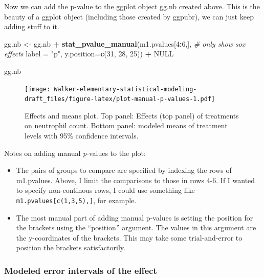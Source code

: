 \documentclass[]{book}
\newenvironment{Shaded}{\begin{snugshade}}{\end{snugshade}}
\newcommand{\CommentTok}[1]{\textcolor[rgb]{0.56,0.35,0.01}{\textit{#1}}}
\newcommand{\DataTypeTok}[1]{\textcolor[rgb]{0.13,0.29,0.53}{#1}}
\newcommand{\DecValTok}[1]{\textcolor[rgb]{0.00,0.00,0.81}{#1}}
\newcommand{\KeywordTok}[1]{\textcolor[rgb]{0.13,0.29,0.53}{\textbf{#1}}}
\newcommand{\NormalTok}[1]{#1}
\newcommand{\OperatorTok}[1]{\textcolor[rgb]{0.81,0.36,0.00}{\textbf{#1}}}
\newcommand{\OtherTok}[1]{\textcolor[rgb]{0.56,0.35,0.01}{#1}}
\newcommand{\StringTok}[1]{\textcolor[rgb]{0.31,0.60,0.02}{#1}}
\providecommand{\tightlist}{%
  \setlength{\itemsep}{0pt}\setlength{\parskip}{0pt}}
\begin{document}
Now we can add the p-value to the ggplot object gg.nb created above. This is the beauty of a ggplot object (including those created by ggpubr), we can just keep adding stuff to it.

\begin{Shaded}
\begin{Highlighting}[]
\NormalTok{gg.nb <-}\StringTok{ }\NormalTok{gg.nb }\OperatorTok{+}
\StringTok{    }\KeywordTok{stat_pvalue_manual}\NormalTok{(m1.pvalues[}\DecValTok{4}\OperatorTok{:}\DecValTok{6}\NormalTok{,], }\CommentTok{# only show sox effects}
                           \DataTypeTok{label =} \StringTok{"p"}\NormalTok{, }
                           \DataTypeTok{y.position=}\KeywordTok{c}\NormalTok{(}\DecValTok{31}\NormalTok{, }\DecValTok{28}\NormalTok{, }\DecValTok{25}\NormalTok{)) }\OperatorTok{+}
\StringTok{  }\OtherTok{NULL}

\NormalTok{gg.nb}
\end{Highlighting}
\end{Shaded}

\begin{figure}
\centering
\texttt{[image: Walker-elementary-statistical-modeling-draft\_files/figure-latex/plot-manual-p-values-1.pdf]}
\caption{\label{fig:plot-manual-p-values}Effects and means plot. Top panel: Effects (top panel) of treatments on neutrophil count. Bottom panel: modeled means of treatment levels with 95\% confidence intervals.}
\end{figure}

Notes on adding manual \emph{p}-values to the plot:

\begin{itemize}
\tightlist
\item
  The pairs of groups to compare are specified by indexing the rows of m1.pvalues. Above, I limit the comparisons to those in rows 4-6. If I wanted to specify non-continous rows, I could use something like \texttt{m1.pvalues{[}c(1,3,5),{]}}, for example.
\item
  The most manual part of adding manual p-values is setting the position for the brackets using the ``position'' argument. The values in this argument are the y-coordinates of the brackets. This may take some trial-and-error to position the brackets satisfactorily.
\end{itemize}

\hypertarget{modeled-error-intervals-of-the-effect}{%
\subsubsection{Modeled error intervals of the effect}\label{modeled-error-intervals-of-the-effect}}
\end{document}
